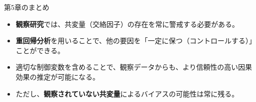 \documentclass[
  ignorenonframetext,
]{beamer}
\providecommand{\tightlist}{%
  \setlength{\itemsep}{0pt}\setlength{\parskip}{0pt}}
\begin{document}
\begin{frame}{第5章のまとめ}
\protect\hypertarget{ux7b2c5ux7ae0ux306eux307eux3068ux3081}{}
\begin{itemize}
\tightlist
\item
  \textbf{観察研究}では、共変量（交絡因子）の存在を常に警戒する必要がある。
\item
  \textbf{重回帰分析}を用いることで、他の要因を「一定に保つ（コントロールする）」ことができる。
\item
  適切な制御変数を含めることで、観察データからも、より信頼性の高い因果効果の推定が可能になる。
\item
  ただし、\textbf{観察されていない共変量}によるバイアスの可能性は常に残る。
\end{itemize}
\end{frame}
\end{document}
